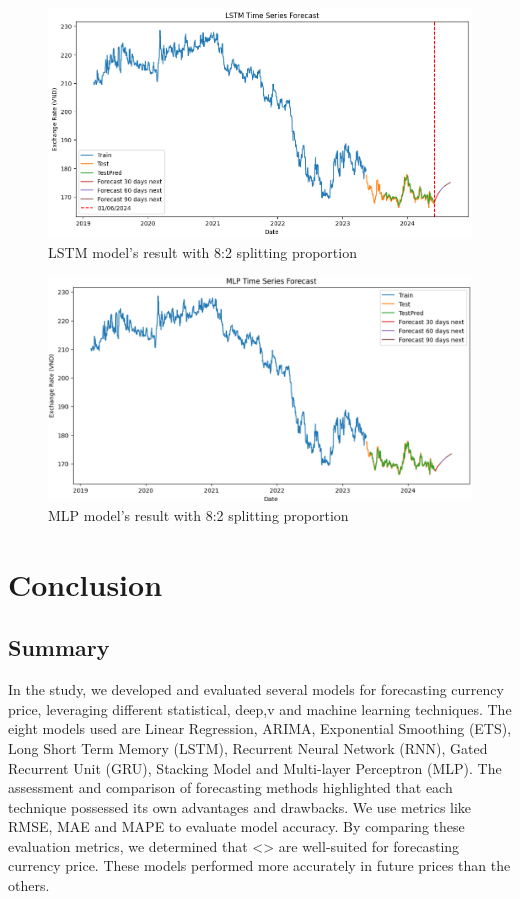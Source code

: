 \documentclass{ieeeojies}
\begin{document}
\begin{figure}[H]
  \centering
  \begin{minipage}{0.8\linewidth}
    \centering
    \includegraphics[width=\linewidth]{LSTM/lstm_jpy82.png}
    \caption{LSTM model's result with 8:2 splitting proportion}
    \label{fig32}
  \end{minipage}
\end{figure}
\begin{figure}[H]
  \centering
  \begin{minipage}{0.8\linewidth}
    \centering
    \includegraphics[width=\linewidth]{MLP/mlp_jpy_82.png}
    \caption{MLP model's result with 8:2 splitting proportion}
    \label{fig33}
  \end{minipage}
\end{figure}

\section{Conclusion}
\subsection{Summary}
In the study, we developed and evaluated several models for forecasting currency price, leveraging different statistical, deep,v and machine learning techniques. The eight models used are Linear Regression, ARIMA, Exponential Smoothing (ETS), Long Short Term Memory (LSTM), Recurrent Neural Network (RNN), Gated
Recurrent Unit (GRU), Stacking Model and Multi-layer Perceptron (MLP). The assessment and comparison of forecasting methods highlighted that each technique possessed its own advantages and drawbacks. We use metrics like RMSE, MAE and MAPE to evaluate model accuracy. By comparing these evaluation metrics, we determined that <> are well-suited for forecasting currency price. These models performed more accurately in future prices than the others. 
\end{document}
